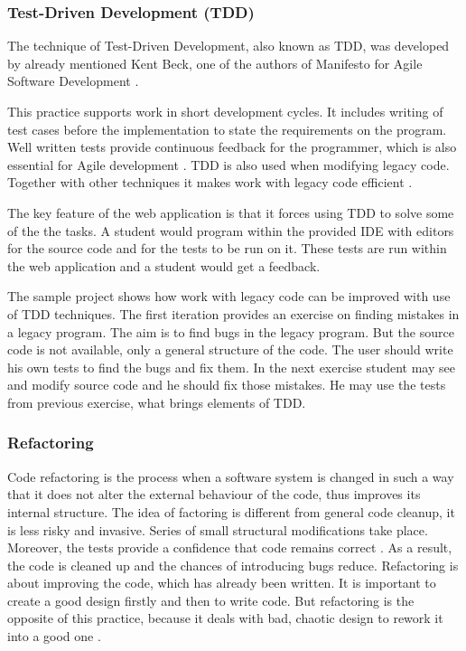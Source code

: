 \subsubsection{Test-Driven Development (TDD)}
The technique of Test-Driven Development, also known as TDD, was developed by already mentioned Kent Beck, one of the authors of Manifesto for Agile Software Development \cite{tdd_example}.

This practice supports work in short development cycles. It includes writing of test cases before the implementation to state the requirements on the program. Well written tests provide continuous feedback for the programmer, which is also essential for Agile development \cite{tdd_dp}. TDD is also used when modifying legacy code. Together with other techniques it makes work with legacy code efficient \cite[Test-Driven Development (TDD)]{lc_effectively}.

The key feature of the web application is that it forces using TDD to solve some of the the tasks. A student would program within the provided IDE with editors for the source code and for the tests to be run on it. These tests are run within the web application and a student would get a feedback.

The sample project shows how work with legacy code can be improved with use of TDD techniques. The first iteration provides an exercise on finding mistakes in a legacy program. The aim is to find bugs in the legacy program. But the source code is not available, only a general structure of the code. The user should write his own tests to find the bugs and fix them. In the next exercise student may see and modify source code and he should fix those mistakes. He may use the tests from previous exercise, what brings elements of TDD.

\subsubsection{Refactoring}
Code refactoring is the process when a software system is changed in such a way that it does not alter the external behaviour of the code, thus improves its internal structure. The idea of factoring is different from general code cleanup, it is less risky and invasive. Series of small structural modifications take place. Moreover, the tests provide a confidence that code remains correct \cite{lc_effectively}. As a result, the code is cleaned up and the chances of introducing bugs reduce. Refactoring is about improving the code, which has already been written. It is important to create a good design firstly and then to write code. But refactoring is the opposite of this practice, because it deals with bad, chaotic design to rework it into a good one \cite[Preface]{ref_ec}.

